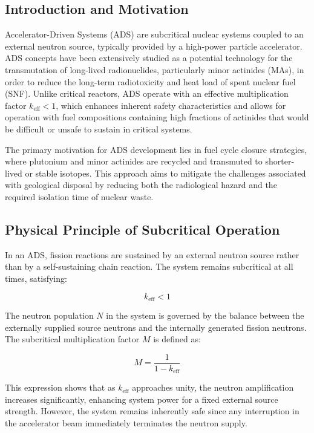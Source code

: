 \subsection{Introduction and Motivation}

Accelerator-Driven Systems (ADS) are subcritical nuclear systems coupled to an external neutron source, typically provided by a 
high-power particle accelerator. ADS concepts have been extensively studied as a potential technology for the transmutation of 
long-lived radionuclides, particularly minor actinides (MAs), in order to reduce the long-term radiotoxicity and heat load of 
spent nuclear fuel (SNF). Unlike critical reactors, ADS operate with an effective multiplication factor $k_{\text{eff}} < 1$, 
which enhances inherent safety characteristics and allows for operation with fuel compositions containing high fractions of 
actinides that would be difficult or unsafe to sustain in critical systems.

The primary motivation for ADS development lies in fuel cycle closure strategies, where plutonium and minor actinides are 
recycled and transmuted to shorter-lived or stable isotopes. This approach aims to mitigate the challenges associated with 
geological disposal by reducing both the radiological hazard and the required isolation time of nuclear waste.

\subsection{Physical Principle of Subcritical Operation}

In an ADS, fission reactions are sustained by an external neutron source rather than by a self-sustaining chain reaction. 
The system remains subcritical at all times, satisfying:

\begin{equation}
k_{\text{eff}} < 1
\end{equation}

The neutron population $N$ in the system is governed by the balance between the externally supplied source neutrons and the 
internally generated fission neutrons. The subcritical multiplication factor $M$ is defined as:

\begin{equation}
M = \frac{1}{1 - k_{\text{eff}}}
\end{equation}

This expression shows that as $k_{\text{eff}}$ approaches unity, the neutron amplification increases significantly, 
enhancing system power for a fixed external source strength. However, the system remains inherently safe since any 
interruption in the accelerator beam immediately terminates the neutron supply.

